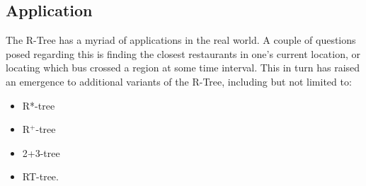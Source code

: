 \documentclass{article}
\begin{document}
\subsection{Application}
The R-Tree has a myriad of applications in the real world. A couple of questions posed regarding this is finding the closest restaurants in one's current location, or locating which bus crossed a region at some time interval. This in turn has raised an emergence to additional variants of the R-Tree, including but not limited to:
\begin{itemize}
	\item R*-tree
	\item R$^+$-tree
	\item 2+3-tree
	\item RT-tree.
\end{itemize}

\printbibliography
\end{document}
